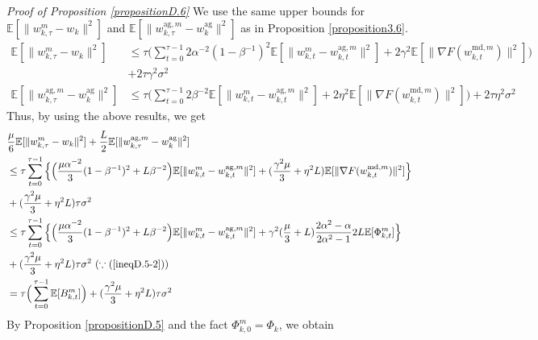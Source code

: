 \documentclass[11pt]{article}
\begin{document}
\emph{Proof of Proposition \ref{propositionD.6}} \textrm{ } We use the same upper bounds for $\mathbb{E}[\|w_{k, \tau}^m - w_k\|^2]$ and $\mathbb{E}[\|w_{k, \tau}^{\textrm{ag}, m} - w_k^{\textrm{ag}}\|^2]$ as in Proposition \ref{proposition3.6}.
\begin{align*}
    \mathbb{E}[\|w_{k, \tau}^m - w_k\|^2] &\leq \tau \Big(\sum_{t=0}^{\tau-1} 2\alpha^{-2}(1-\beta^{-1})^2\mathbb{E}[\|w_{k, t}^m- w_{k, t}^{\textrm{ag}, m}\|^2 ] + 2\gamma^2\mathbb{E}[\|\nabla F(w_{k, t}^{\textrm{md}, m})\|^2]\Big) \\
    &+2\tau\gamma^2\sigma^2 \\
    \mathbb{E}[\|w_{k, \tau}^{\textrm{ag}, m} - w_k^{\textrm{ag}}\|^2] &\leq \tau \Big(\sum_{t=0}^{\tau-1} 2\beta^{-2}\mathbb{E}[\|w_{k, t}^m - w_{k, t}^{\textrm{ag}, m}\|^2] + 2\eta^2\mathbb{E}[\|\nabla F(w_{k, t}^{\textrm{md}, m})\|^2]\Big) +2\tau\eta^2\sigma^2
\end{align*}
Thus, by using the above results, we get
\begin{align*}
    &\frac{\mu}{6}\mathbb{E}[\|w_{k, \tau}^m - w_k\|^2] + \frac{L}{2} \mathbb{E}[\|w_{k, \tau}^{\textrm{ag}, m} - w_k^{\textrm{ag}}\|^2] \\
    &\leq \tau \sum_{t=0}^{\tau-1} \Big\{ \Big(\frac{\mu\alpha^{-2}}{3}(1-\beta^{-1})^2 + L\beta^{-2}\Big)\mathbb{E}[\|w_{k, t}^m - w_{k, t}^{\textrm{ag}, m}\|^2] + (\frac{\gamma^2\mu}{3} + \eta^2 L)\mathbb{E}[\|\nabla F(w_{k, t}^{\textrm{md}, m})\|^2]\Big\} \\
    &+ (\frac{\gamma^2\mu}{3}+\eta^2 L)\tau\sigma^2 \\
    &\leq \tau \sum_{t=0}^{\tau-1} \Big\{ \Big(\frac{\mu\alpha^{-2}}{3}(1-\beta^{-1})^2 + L\beta^{-2}\Big)\mathbb{E}[\|w_{k, t}^m - w_{k, t}^{\textrm{ag}, m}\|^2] + \gamma^2(\frac{\mu}{3}+L)\frac{2\alpha^2-\alpha}{2\alpha^2-1}2L\mathbb{E}[\Phi_{k, t}^m]\Big\} \\
    &+ (\frac{\gamma^2\mu}{3}+\eta^2 L)\tau\sigma^2 \textrm{ }(\because (\ref{ineqD.5-2})) \\
    &= \tau \Big( \sum_{t=0}^{\tau-1} \mathbb{E}[B_{k, t}^m]\Big) + (\frac{\gamma^2\mu}{3}+\eta^2 L)\tau\sigma^2
\end{align*}
By Proposition \ref{propositionD.5} and the fact $\Phi_{k, 0}^m = \Phi_k$, we obtain
\end{document}
